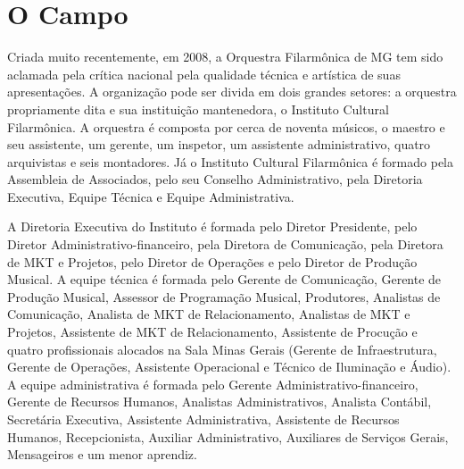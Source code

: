\documentclass[a4paper, 12pt, openright, oneside, german, french, english, brazil]{abntex2}
\begin{document}
	\chapter{O Campo}

	

	Criada muito recentemente, em 2008, a Orquestra Filarmônica de MG tem sido aclamada pela crítica nacional pela qualidade técnica e artística de suas apresentações. A organização pode ser divida em dois grandes setores: a orquestra propriamente dita e sua instituição mantenedora, o Instituto Cultural Filarmônica. A orquestra é composta por cerca de noventa músicos, o maestro e seu assistente, um gerente, um inspetor, um assistente administrativo, quatro arquivistas e seis montadores. Já o Instituto Cultural Filarmônica é formado pela Assembleia de Associados, pelo seu Conselho Administrativo, pela Diretoria Executiva, Equipe Técnica e Equipe Administrativa.



	A Diretoria Executiva do Instituto é formada pelo Diretor Presidente, pelo Diretor Administrativo-financeiro, pela Diretora de Comunicação, pela Diretora de MKT e Projetos, pelo Diretor de Operações e pelo Diretor de Produção Musical. A equipe técnica é formada pelo Gerente de Comunicação, Gerente de Produção Musical, Assessor de Programação Musical, Produtores, Analistas de Comunicação, Analista de MKT de Relacionamento, Analistas de MKT e Projetos, Assistente de MKT de Relacionamento, Assistente de Procução e quatro profissionais alocados na Sala Minas Gerais (Gerente de Infraestrutura, Gerente de Operações, Assistente Operacional e Técnico de Iluminação e Áudio). A equipe administrativa é formada pelo Gerente Administrativo-financeiro, Gerente de Recursos Humanos, Analistas Administrativos, Analista Contábil, Secretária Executiva, Assistente Administrativa, Assistente de Recursos Humanos, Recepcionista, Auxiliar Administrativo, Auxiliares de Serviços Gerais, Mensageiros e um menor aprendiz.
\end{document}
